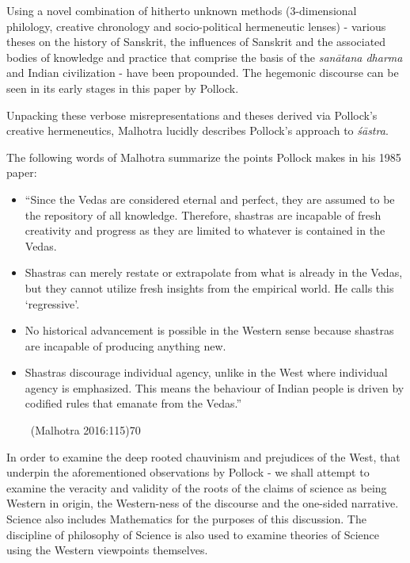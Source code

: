 Using a novel combination of hitherto unknown methods (3-dimen\-sion\-al philology, creative chronology and socio-political hermeneutic lenses) - various theses on the history of Sanskrit, the influences of Sanskrit and the associated bodies of knowledge and practice that comprise the basis of the \textit{sanātana dharma} and Indian civilization - have been propounded. The hegemonic discourse can be seen in its early stages in this paper by Pollock.

Unpacking these verbose misrepresentations and theses derived via Pollock’s creative hermeneutics, Malhotra lucidly describes Pollock’s approach to \textit{śāstra}.

The following words of Malhotra summarize the points Pollock makes in his 1985 paper:

\begin{itemize}
\item “Since the Vedas are considered eternal and perfect, they are assumed to be the repository of all knowledge. Therefore, shastras are incapable of fresh creativity and progress as they are limited to whatever is contained in the Vedas.

 \item Shastras can merely restate or extrapolate from what is already in the Vedas, but they cannot utilize fresh insights from the empirical world. He calls this ‘regressive’.

 \item No historical advancement is possible in the Western sense because shastras are incapable of producing anything new.

 \item Shastras discourage individual agency, unlike in the West where individual agency is emphasized. This means the behaviour of Indian people is driven by codified rules that emanate from the Vedas.”

~\hfill (Malhotra 2016:115)70

\end{itemize}

In order to examine the deep rooted chauvinism and prejudices of the West, that underpin the aforementioned observations by Pollock - we shall attempt to examine the veracity and validity of the roots of the claims of science as being Western in origin, the Western-ness of the discourse and the one-sided narrative. Science also includes Mathematics for the purposes of this discussion. The discipline of philosophy of Science is also used to examine theories of Science using the Western viewpoints themselves.


